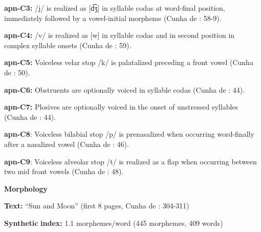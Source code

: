 \documentclass[output=paper]{langsci/langscibook}
\begin{document}
\begin{styleBody}
\textbf{apn-C3:} /j/ is realized as [d͡ʒ] in syllable codas at word-final position, immediately followed by a vowel-initial morpheme (Cunha de \citealt{Oliveira2005}: 58-9).
\end{styleBody}

\begin{styleBody}
\textbf{apn-C4:} /v/ is realized as [w] in syllable codas and in second position in complex syllable onsets (Cunha de \citealt{Oliveira2005}: 59).
\end{styleBody}

\begin{styleBody}
\textbf{apn-C5:} Voiceless velar stop /k/ is palatalized preceding a front vowel (Cunha de \citealt{Oliveira2005}: 50).
\end{styleBody}

\begin{styleBody}
\textbf{apn-C6:} Obstruents are optionally voiced in syllable codas (Cunha de \citealt{Oliveira2005}: 44).
\end{styleBody}

\begin{styleBody}
\textbf{apn-C7:} Plosives are optionally voiced in the onset of unstressed syllables (Cunha de \citealt{Oliveira2005}: 44).
\end{styleBody}

\begin{styleBody}
\textbf{apn-C8}: Voiceless bilabial stop /p/ is prenasalized when occurring word-finally after a nasalized vowel (Cunha de \citealt{Oliveira2005}: 46).
\end{styleBody}

\begin{styleBody}
\textbf{apn-C9}: Voiceless alveolar stop /t/ is realized as a flap when occurring between two mid front vowels (Cunha de \citealt{Oliveira2005}: 48).
\end{styleBody}

\begin{styleBody}
\textbf{Morphology}
\end{styleBody}

\begin{styleBody}
\textbf{Text:} “Sun and Moon” (first 8 pages, Cunha de \citealt{Oliveira2005}: 304-311)
\end{styleBody}

\begin{styleBody}
\textbf{Synthetic} \textbf{index:} 1.1 morphemes/word (445 morphemes, 409 words)
\end{styleBody}
\end{document}
